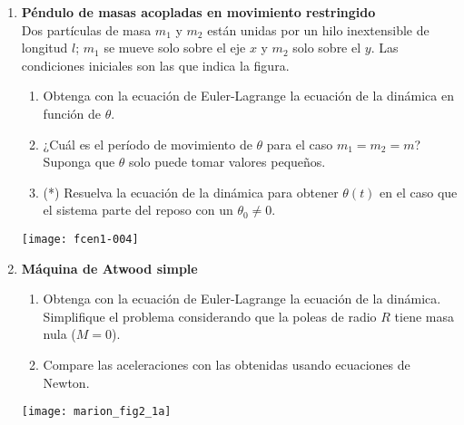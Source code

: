\documentclass[11pt, spanish, a4paper, twoside]{article}
\begin{document}
\begin{enumerate}
\item 
\begin{minipage}[t][5cm]{0.7\textwidth}
\textbf{Péndulo de masas acopladas en movimiento restringido}\\ 
Dos partículas de masa \(m_1\) y \(m_2\) están unidas por un hilo inextensible de longitud \(l\); \(m_1\) se mueve solo sobre el eje \(x\) y \(m_2\) solo sobre el \(y\).
Las condiciones iniciales son las que indica la figura.
\begin{enumerate}
	\item Obtenga con la ecuación de Euler-Lagrange la ecuación de la dinámica en función de \(\theta\).
	\item ¿Cuál es el período de movimiento de \(\theta\) para el caso \(m_1 = m_2 = m\)?
	Suponga que \(\theta\) solo puede tomar valores pequeños.
	\item (*) Resuelva la ecuación de la dinámica para obtener \(\theta(t)\) en el caso que el sistema parte del reposo con un \(\theta_0 \neq 0\).
\end{enumerate}
\end{minipage}
\begin{minipage}[c][0cm][t]{0.3\textwidth}
	\texttt{[image: fcen1-004]}
\end{minipage}



%


\item 
\begin{minipage}[t][4cm]{0.65\textwidth}
\textbf{Máquina de Atwood simple}\\
\begin{enumerate}
	\item Obtenga con la ecuación de Euler-Lagrange la ecuación de la dinámica.
	Simplifique el problema considerando que la poleas de radio \(R\) tiene masa nula (\(M=0\)).
	\item Compare las aceleraciones con las obtenidas usando ecuaciones de Newton.
\end{enumerate}
\end{minipage}
\begin{minipage}[c][2cm][t]{0.35\textwidth}
	\texttt{[image: marion\_fig2\_1a]}
\end{minipage}




\end{enumerate}
\end{document}
